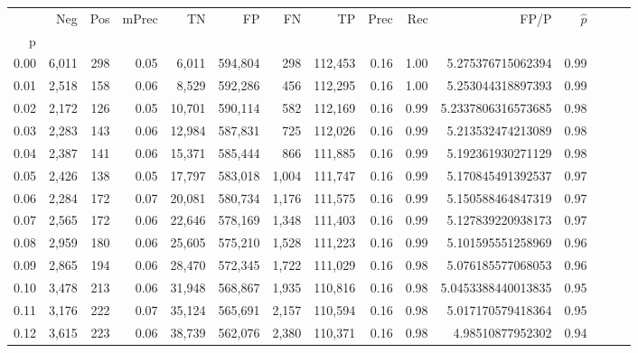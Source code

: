 \begin{tabular}{rrrrrrrrrrrrrrr}
\toprule
{} &     Neg &    Pos & mPrec &       TN &       FP &       FN &       TP &  Prec &   Rec &                  FP/P & $\hat{p}$ \\
p    &         &        &       &          &          &          &          &       &       &                       &           \\
\midrule
0.00 &   6,011 &    298 &  0.05 &    6,011 &  594,804 &      298 &  112,453 &  0.16 &  1.00 &     5.275376715062394 &      0.99 \\
0.01 &   2,518 &    158 &  0.06 &    8,529 &  592,286 &      456 &  112,295 &  0.16 &  1.00 &     5.253044318897393 &      0.99 \\
0.02 &   2,172 &    126 &  0.05 &   10,701 &  590,114 &      582 &  112,169 &  0.16 &  0.99 &    5.2337806316573685 &      0.98 \\
0.03 &   2,283 &    143 &  0.06 &   12,984 &  587,831 &      725 &  112,026 &  0.16 &  0.99 &     5.213532474213089 &      0.98 \\
0.04 &   2,387 &    141 &  0.06 &   15,371 &  585,444 &      866 &  111,885 &  0.16 &  0.99 &     5.192361930271129 &      0.98 \\
0.05 &   2,426 &    138 &  0.05 &   17,797 &  583,018 &    1,004 &  111,747 &  0.16 &  0.99 &     5.170845491392537 &      0.97 \\
0.06 &   2,284 &    172 &  0.07 &   20,081 &  580,734 &    1,176 &  111,575 &  0.16 &  0.99 &     5.150588464847319 &      0.97 \\
0.07 &   2,565 &    172 &  0.06 &   22,646 &  578,169 &    1,348 &  111,403 &  0.16 &  0.99 &     5.127839220938173 &      0.97 \\
0.08 &   2,959 &    180 &  0.06 &   25,605 &  575,210 &    1,528 &  111,223 &  0.16 &  0.99 &     5.101595551258969 &      0.96 \\
0.09 &   2,865 &    194 &  0.06 &   28,470 &  572,345 &    1,722 &  111,029 &  0.16 &  0.98 &     5.076185577068053 &      0.96 \\
0.10 &   3,478 &    213 &  0.06 &   31,948 &  568,867 &    1,935 &  110,816 &  0.16 &  0.98 &    5.0453388440013835 &      0.95 \\
0.11 &   3,176 &    222 &  0.07 &   35,124 &  565,691 &    2,157 &  110,594 &  0.16 &  0.98 &     5.017170579418364 &      0.95 \\
0.12 &   3,615 &    223 &  0.06 &   38,739 &  562,076 &    2,380 &  110,371 &  0.16 &  0.98 &      4.98510877952302 &      0.94 \\

\end{tabular}
